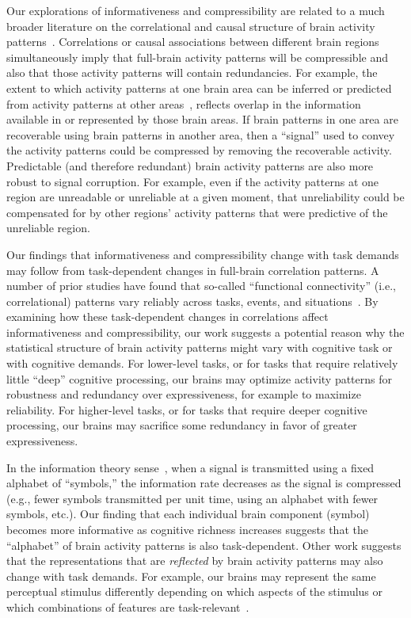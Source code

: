 \documentclass[english, 11pt]{article}
\begin{document}
Our explorations of informativeness and compressibility are related to a much
broader literature on the correlational and causal structure of brain activity
patterns~\citep{PretEtal17, OwenEtal21, RogeEtal07, RubiSpor10, SizeEtal18,
SmitEtal13b, SmitEtal13c, SrinEtal07, TomaVolk11, YeoEtal11, AdacEtal12,
BassSpor17, BullSpor09, SporHone06, SporBetz16, SporZwi04, DhamEtal08,
KorzEtal08, BrovEtal04}. Correlations or causal associations between different
brain regions simultaneously imply that full-brain activity patterns will be
compressible and also that those activity patterns will contain redundancies.
For example, the extent to which activity patterns at one brain area can be
inferred or predicted from activity patterns at other
areas~\citep[e.g.,][]{OwenEtal20, ScanEtal21}, reflects overlap in the
information available in or represented by those brain areas. If brain patterns
in one area are recoverable using brain patterns in another area, then a
``signal'' used to convey the activity patterns could be compressed by removing
the recoverable activity. Predictable (and therefore redundant) brain activity
patterns are also more robust to signal corruption. For example, even if the
activity patterns at one region are unreadable or unreliable at a given moment,
that unreliability could be compensated for by other regions' activity patterns
that were predictive of the unreliable region.

Our findings that informativeness and compressibility change with task demands
may follow from task-dependent changes in full-brain correlation patterns. A
number of prior studies have found that so-called ``functional connectivity''
(i.e., correlational) patterns vary reliably across tasks, events, and
situations~\citep{SimoEtal16, ColeEtal14, SmitEtal09, OwenEtal21}. By examining
how these task-dependent changes in correlations affect informativeness and
compressibility, our work suggests a potential reason why the statistical
structure of brain activity patterns might vary with cognitive task or with
cognitive demands. For lower-level tasks, or for tasks that require relatively
little ``deep'' cognitive processing, our brains may optimize activity patterns
for robustness and redundancy over expressiveness, for example to maximize
reliability. For higher-level tasks, or for tasks that require deeper cognitive
processing, our brains may sacrifice some redundancy in favor of greater
expressiveness.

In the information theory sense~\citep{Shan48}, when a signal is transmitted
using a fixed alphabet of ``symbols,'' the information rate decreases as the
signal is compressed (e.g., fewer symbols transmitted per unit time, using an
alphabet with fewer symbols, etc.). Our finding that each individual brain
component (symbol) becomes more informative as cognitive richness increases
suggests that the ``alphabet'' of brain activity patterns is also
task-dependent. Other work suggests that the representations that are
\textit{reflected} by brain activity patterns may also change with task
demands. For example, our brains may represent the same perceptual stimulus
differently depending on which aspects of the stimulus or which combinations of
features are task-relevant~\citep{MackEtal20}.
\end{document}
